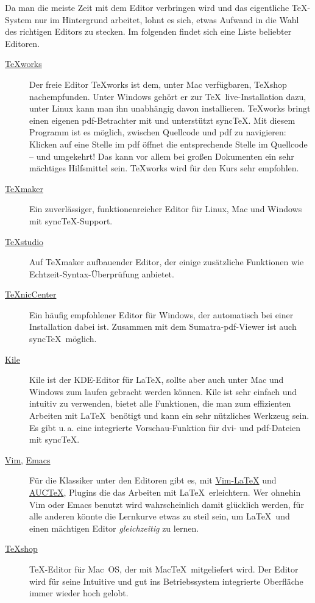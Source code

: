 \documentclass[
	ausgabe=2016-11-24,
	titel=Installationshinweise,
	shortverb=true,
]{../tex/latexkurs-exercise}
\begin{document}
Da man die meiste Zeit mit dem Editor verbringen wird und das eigentliche \TeX-System nur im Hintergrund arbeitet, lohnt es sich, etwas Aufwand in die Wahl des richtigen Editors zu stecken. Im folgenden findet sich eine Liste beliebter Editoren.

\begin{description}
\item[\href{http://www.tug.org/texworks/}{\TeX works}]
Der freie Editor {\TeX works} ist dem, unter Mac verfügbaren, \TeX shop nachempfunden. Unter Windows gehört er zur \TeX\ live-Installation dazu, unter Linux kann man ihn unabhängig davon installieren. \TeX works bringt einen eigenen pdf-Betrachter mit und unterstützt sync\TeX. Mit diesem Programm ist es möglich, zwischen Quellcode und pdf zu navigieren: Klicken auf eine Stelle im pdf öffnet die entsprechende Stelle im Quellcode – und umgekehrt! Das kann vor allem bei großen Dokumenten ein sehr mächtiges Hilfsmittel sein. \TeX works wird für den Kurs sehr empfohlen.

\item[\href{http://www.xm1math.net/texmaker/}{TeXmaker}]
Ein zuverlässiger, funktionenreicher Editor für Linux, Mac und Windows mit sync\TeX-Support.

\item[\href{http://texstudio.sourceforge.net/}{\TeX studio}]
Auf TeXmaker aufbauender Editor, der einige zusätzliche Funktionen wie Echtzeit-Syntax-Überprüfung anbietet.

\item[\href{http://www.texniccenter.org/}{\TeX nicCenter}]
Ein häufig empfohlener Editor für Windows, der automatisch bei einer \-Installation dabei ist. Zusammen mit dem Sumatra-pdf-Viewer ist auch sync\TeX\ möglich.

\item[\href{http://kile.sourceforge.net/}{Kile}]
Kile ist der KDE-Editor für \LaTeX, sollte aber auch unter Mac und Windows zum laufen gebracht werden können. Kile ist sehr einfach und intuitiv zu verwenden, bietet alle Funktionen, die man zum effizienten Arbeiten mit \LaTeX\ benötigt und kann ein sehr nützliches Werkzeug sein. Es gibt u.\,a. eine integrierte Vorschau-Funktion für dvi- und pdf-Dateien mit sync\TeX.

\item[\href{http://www.vim.org/}{Vim}, \href{http://www.gnu.org/software/emacs}{Emacs}]
Für die Klassiker unter den Editoren gibt es, mit \href{http://vim-latex.sourceforge.net/}{Vim-LaTeX} und \href{http://www.gnu.org/software/auctex/}{AUC\TeX}, Plugins die das Arbeiten mit \LaTeX\ erleichtern. Wer ohnehin Vim oder Emacs benutzt wird wahrscheinlich damit glücklich werden, für alle anderen könnte die Lernkurve etwas zu steil sein, um \LaTeX\ und einen mächtigen Editor \emph{gleichzeitig} zu lernen.

\item[\href{http://pages.uoregon.edu/koch/texshop}{\TeX shop}]
\TeX-Editor für Mac~OS, der mit Mac\TeX\ mitgeliefert wird. Der Editor wird für seine Intuitive und gut ins Betriebssystem integrierte Oberfläche immer wieder hoch gelobt.
\end{description}
\end{document}
